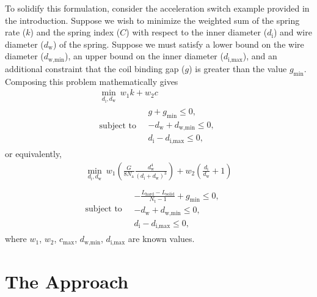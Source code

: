 \documentclass[10pt]{article}
\begin{document}
To solidify this formulation, consider the acceleration switch example provided in the introduction. Suppose we wish to minimize the weighted sum of the spring rate ($k$) and the spring index ($C$) with respect to the inner diameter ($d_{\text{i}}$) and wire diameter ($d_{\text{w}}$) of the spring. Suppose we must satisfy a lower bound on the wire diameter ($d_{\text{w,min}}$), an upper bound on the inner diameter ($d_{\text{i,max}}$), and an additional constraint that the coil binding gap ($g$) is greater than the value $g_{\text{min}}$. Composing this problem mathematically gives
				\begin{equation}
 					\begin{gathered}
 						\min_{d_{\text{i}}, d_{\text{w}}} \ w_{1}k + w_{2}c \\
 						\mbox{subject to} \quad
						 \begin{split} 
						 	g + g_{\text{min}}\le 0, \\
						 	-d_{\text{w}} + d_{\text{w,min}}\le 0, \\
							d_{\text{i}} - d_{\text{i,max}} \le 0,
						\end{split}
					\end{gathered}
				\end{equation}
or equivalently,
 					\begin{equation}
 					\begin{gathered}
 						\min_{d_{\text{i}}, d_{\text{w}}} \ w_{1}\left(\frac{G}{8N_{\text{a}}}\frac{d_{\text{w}}^{4}}{(d_{\text{i}} + d_{\text{w}})^{3}}\right) + w_{2}\left(\frac{d_{\text{i}}}{d_{\text{w}}} + 1\right) \\ \\
 						\mbox{subject to} \quad
						 \begin{split} 
						 	-\frac{L_{\text{hard}} - L_{\text{solid}}}{N_{\text{t}} - 1} + g_{\text{min}}\le 0, \\
						 	-d_{\text{w}} + d_{\text{w,min}}\le 0, \\
							d_{\text{i}} - d_{\text{i,max}} \le 0,
						\end{split}
					\end{gathered}
					\label{eq:Problem}
				\end{equation}				
where $w_{1}$, $w_{2}$, $c_{\text{max}}$, $d_{\text{w,min}}$, $d_{\text{i,max}}$ are known values.

\section{The Approach}
\label{sec:The_Approach}
\end{document}
